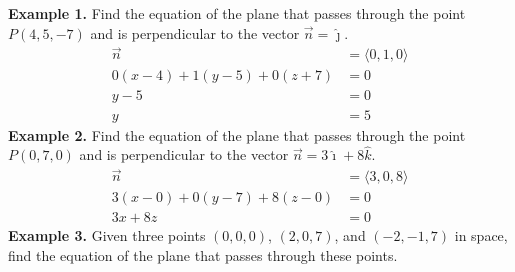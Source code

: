 \documentclass{report}
\begin{document}
\newpage
\noindent\textbf{Example 1. } Find the
equation of the plane that passes through the point $P(4, 5, -7)$ and is
perpendicular to the vector $\vec{n} = \hat{\jmath}$.
\begin{align*}
    \vec{n}                        & = \langle 0, 1, 0 \rangle \\
    0(x - 4) + 1(y - 5) + 0(z + 7) & = 0                       \\
    y - 5                          & = 0                       \\
    y                              & = 5
\end{align*}
\noindent\textbf{Example 2. } Find the
equation of the plane that passes through the point $P(0, 7, 0)$ and is
perpendicular to the vector $\vec{n} = 3\hat{\imath} + 8\hat{k}$.
\begin{align*}
    \vec{n}                        & = \langle 3, 0, 8 \rangle \\
    3(x - 0) + 0(y - 7) + 8(z - 0) & = 0                       \\
    3x + 8z                        & = 0
\end{align*}
\noindent\textbf{Example 3. } Given three points $(0, 0, 0)$, $(2, 0, 7)$, and $(-2, -1, 7)$ in space, find the equation of the plane that passes through these points.
\end{document}
